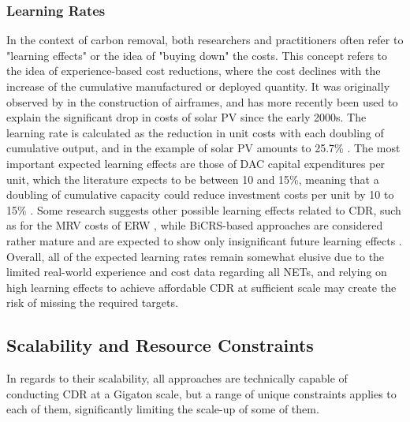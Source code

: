 \subsubsection{Learning Rates}
In the context of carbon removal, both researchers and practitioners often refer to "learning effects" or the idea of "buying down" the costs. This concept refers to the idea of experience-based cost reductions, where the cost declines with the increase of the cumulative manufactured or deployed quantity. It was originally observed by \textcite{wright_factors_1936} in the construction of airframes, and has more recently been used to explain the significant drop in costs of solar PV since the early 2000s. The learning rate is calculated as the reduction in unit costs with each doubling of cumulative output, and in the example of solar PV amounts to 25.7\% \parencite{philipps_photovoltaics_2025}. The most important expected learning effects are those of DAC capital expenditures per unit, which the literature expects to be between 10 and 15\%, meaning that a doubling of cumulative capacity could reduce investment costs per unit by 10 to 15\% \parencite{al-juaied_prospects_2023}. Some research suggests other possible learning effects related to CDR, such as for the MRV costs of ERW \parencite{reershemius_initial_2023}, while BiCRS-based approaches are considered rather mature and are expected to show only insignificant future learning effects \parencite{iata_carbon_2025}. Overall, all of the expected learning rates remain somewhat elusive due to the limited real-world experience and cost data regarding all NETs, and relying on high learning effects to achieve affordable CDR at sufficient scale may create the risk of missing the required targets.

\subsection{Scalability and Resource Constraints}
In regards to their scalability, all approaches are technically capable of conducting CDR at a Gigaton scale, but a range of unique constraints applies to each of them, significantly limiting the scale-up of some of them.


